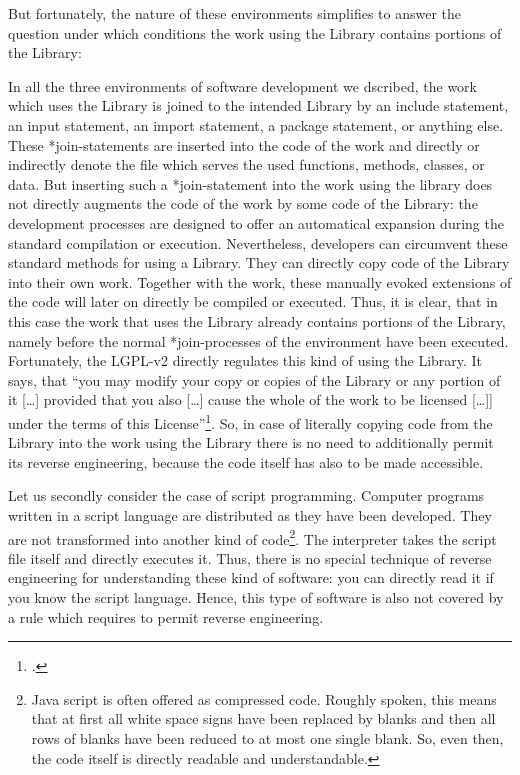 But fortunately, the nature of these environments simplifies to answer the
question under which conditions the work using the Library contains portions of
the Library:

In all the three environments of software development we dscribed, the work
which uses the Library is joined to the intended Library by an include
statement, an input statement, an import statement, a package statement, or
anything else. These *join-statements are inserted into the code of the work and
directly or indirectly denote the file which serves the used functions, methods,
classes, or data. But inserting such a *join-statement into the work using the
library does not directly augments the code of the work by some code of the
Library: the development processes are designed to offer an automatical
expansion during the standard compilation or execution. Nevertheless, developers
can circumvent these standard methods for using a Library. They can directly
copy code of the Library into their own work. Together with the work, these
manually evoked extensions of the code will later on directly be compiled or
executed. Thus, it is clear, that in this case the work that uses the Library
already contains portions of the Library, namely before the normal
*join-processes of the environment have been executed. Fortunately, the LGPL-v2
directly regulates this kind of using the Library. It says, that \enquote{you
may modify your copy or copies of the Library or any portion of it [\ldots]
provided that you also [\ldots] cause the whole of the work to be licensed
[\ldots]] under the terms of this License}\footcite[cf.][\nopage wp.,§2,
escpcially §2c]{Lgpl21OsiLicense1999a}.
So, in case of literally copying code from the Library into the work using the
Library there is no need to additionally permit its reverse engineering, because
the code itself has also to be made accessible.

Let us secondly consider the case of script programming. Computer programs
written in a script language are distributed as they have been developed. They are not
transformed into another kind of code\footnote{Java script is often offered as
compressed code. Roughly spoken, this means that at first all white space signs
have been replaced by blanks and then all rows of blanks have been reduced to at
most one single blank. So, even then, the code itself is directly readable and
understandable.}. The interpreter takes the script file itself and directly
executes it. Thus, there is no special technique of reverse engineering for
understanding these kind of software: you can directly read it if you know the
script language. Hence, this type of software is also not covered by a rule
which requires to permit reverse engineering.

